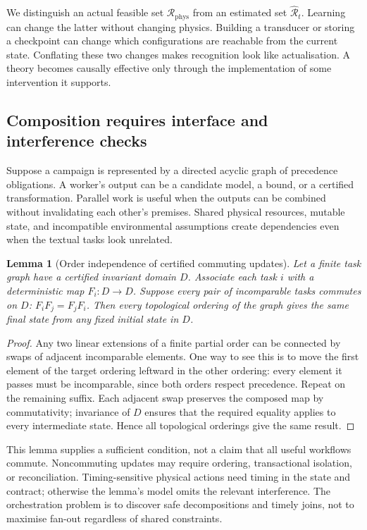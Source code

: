 \documentclass[11pt,a4paper]{article}
\newtheorem{lemma}[theorem]{Lemma}
\theoremstyle{definition}
\theoremstyle{remark}
\begin{document}
We distinguish an actual feasible set $\mathscr R_{\mathrm{phys}}$ from an estimated set $\widehat{\mathscr R}_t$. Learning can change the latter without changing physics. Building a transducer or storing a checkpoint can change which configurations are reachable from the current state. Conflating these two changes makes recognition look like actualisation. A theory becomes causally effective only through the implementation of some intervention it supports.

\subsection{Composition requires interface and interference checks}
Suppose a campaign is represented by a directed acyclic graph of precedence obligations. A worker's output can be a candidate model, a bound, or a certified transformation. Parallel work is useful when the outputs can be combined without invalidating each other's premises. Shared physical resources, mutable state, and incompatible environmental assumptions create dependencies even when the textual tasks look unrelated.

\begin{lemma}[Order independence of certified commuting updates]\label{lem:commute}
Let a finite task graph have a certified invariant domain $D$. Associate each task $i$ with a deterministic map $F_i:D\to D$. Suppose every pair of incomparable tasks commutes on $D$: $F_iF_j=F_jF_i$. Then every topological ordering of the graph gives the same final state from any fixed initial state in $D$.
\end{lemma}
\begin{proof}
Any two linear extensions of a finite partial order can be connected by swaps of adjacent incomparable elements. One way to see this is to move the first element of the target ordering leftward in the other ordering: every element it passes must be incomparable, since both orders respect precedence. Repeat on the remaining suffix. Each adjacent swap preserves the composed map by commutativity; invariance of $D$ ensures that the required equality applies to every intermediate state. Hence all topological orderings give the same result.
\end{proof}
This lemma supplies a sufficient condition, not a claim that all useful workflows commute. Noncommuting updates may require ordering, transactional isolation, or reconciliation. Timing-sensitive physical actions need timing in the state and contract; otherwise the lemma's model omits the relevant interference. The orchestration problem is to discover safe decompositions and timely joins, not to maximise fan-out regardless of shared constraints.
\end{document}

